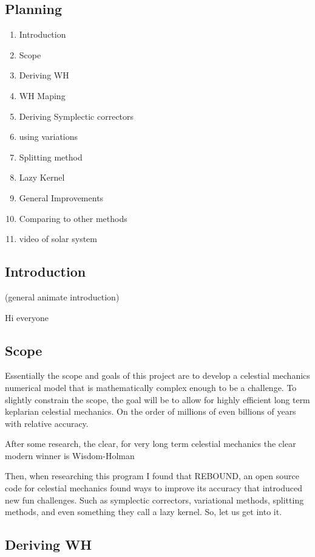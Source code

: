 \subsection{Planning}%
\begin{enumerate}
	\item Introduction
	\item Scope
	\item Deriving WH
	\item WH Maping
	\item Deriving Symplectic correctors
	\item using variations
	\item Splitting method
	\item Lazy Kernel
	\item General Improvements
	\item Comparing to other methods
	\item video of solar system
\end{enumerate}

\subsection{Introduction}

(general animate introduction)

Hi everyone

\subsection{Scope}

Essentially the scope and goals of this project are to develop a celestial mechanics numerical model that is mathematically complex enough to be a challenge. To slightly constrain the scope, the goal will be to allow for highly efficient long term keplarian celestial mechanics. On the order of millions of even billions of years with relative accuracy.

After some research, the clear, for very long term celestial mechanics the clear modern winner is Wisdom-Holman

Then, when researching this program I found that REBOUND, an open source code for celestial mechanics found ways to improve its accuracy that introduced new fun challenges. Such as symplectic correctors, variational methods, splitting methods, and even something they call a lazy kernel. So, let us get into it.


\subsection{Deriving WH}

